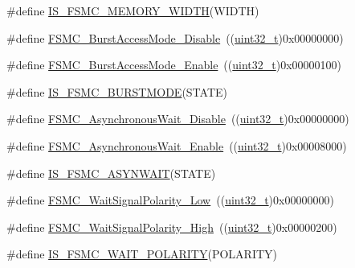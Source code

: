 \begin{DoxyCompactItemize}
\item 
\#define \hyperlink{group___f_s_m_c___data___width_ga003d52b62f5950fb041f73f15ce20171}{I\+S\+\_\+\+F\+S\+M\+C\+\_\+\+M\+E\+M\+O\+R\+Y\+\_\+\+W\+I\+D\+TH}(W\+I\+D\+TH)
\item 
\#define \hyperlink{group___f_s_m_c___burst___access___mode_ga26fc544945415e350563a9b00684850c}{F\+S\+M\+C\+\_\+\+Burst\+Access\+Mode\+\_\+\+Disable}~((\hyperlink{_p_e___types_8h_a33594304e786b158f3fb30289278f5af}{uint32\+\_\+t})0x00000000)
\item 
\#define \hyperlink{group___f_s_m_c___burst___access___mode_ga841831dfacfdd8889dafe26cc594bf02}{F\+S\+M\+C\+\_\+\+Burst\+Access\+Mode\+\_\+\+Enable}~((\hyperlink{_p_e___types_8h_a33594304e786b158f3fb30289278f5af}{uint32\+\_\+t})0x00000100)
\item 
\#define \hyperlink{group___f_s_m_c___burst___access___mode_gaf8736659c5064c3c03753d7874401e71}{I\+S\+\_\+\+F\+S\+M\+C\+\_\+\+B\+U\+R\+S\+T\+M\+O\+DE}(S\+T\+A\+TE)
\item 
\#define \hyperlink{group___f_s_m_c___asynchronous_wait_ga36c0dad6fe6c0e01632d3312c8f4c4cb}{F\+S\+M\+C\+\_\+\+Asynchronous\+Wait\+\_\+\+Disable}~((\hyperlink{_p_e___types_8h_a33594304e786b158f3fb30289278f5af}{uint32\+\_\+t})0x00000000)
\item 
\#define \hyperlink{group___f_s_m_c___asynchronous_wait_gaff524bfa697106ede7d4b557a5ad7d8c}{F\+S\+M\+C\+\_\+\+Asynchronous\+Wait\+\_\+\+Enable}~((\hyperlink{_p_e___types_8h_a33594304e786b158f3fb30289278f5af}{uint32\+\_\+t})0x00008000)
\item 
\#define \hyperlink{group___f_s_m_c___asynchronous_wait_ga52d579de825316ee058baf11bfb749d6}{I\+S\+\_\+\+F\+S\+M\+C\+\_\+\+A\+S\+Y\+N\+W\+A\+IT}(S\+T\+A\+TE)
\item 
\#define \hyperlink{group___f_s_m_c___wait___signal___polarity_ga7dc72fdfc6225e5daa9b8efee8dff49f}{F\+S\+M\+C\+\_\+\+Wait\+Signal\+Polarity\+\_\+\+Low}~((\hyperlink{_p_e___types_8h_a33594304e786b158f3fb30289278f5af}{uint32\+\_\+t})0x00000000)
\item 
\#define \hyperlink{group___f_s_m_c___wait___signal___polarity_ga3418f29249a261edb1359d1bcdc43661}{F\+S\+M\+C\+\_\+\+Wait\+Signal\+Polarity\+\_\+\+High}~((\hyperlink{_p_e___types_8h_a33594304e786b158f3fb30289278f5af}{uint32\+\_\+t})0x00000200)
\item 
\#define \hyperlink{group___f_s_m_c___wait___signal___polarity_gabc5321807d5184fe5cdb7848e1be7bc6}{I\+S\+\_\+\+F\+S\+M\+C\+\_\+\+W\+A\+I\+T\+\_\+\+P\+O\+L\+A\+R\+I\+TY}(P\+O\+L\+A\+R\+I\+TY)
\item 

\end{DoxyCompactItemize}
